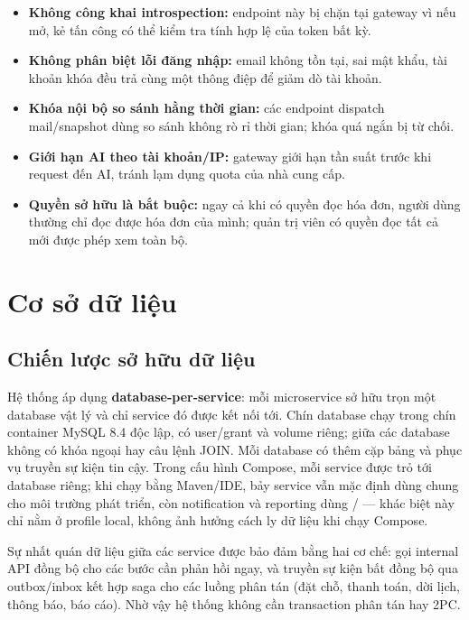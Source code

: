 \begin{itemize}
  \item \textbf{Không công khai introspection:} endpoint này bị chặn tại gateway vì nếu mở, kẻ tấn công có thể kiểm tra tính hợp lệ của token bất kỳ.
  \item \textbf{Không phân biệt lỗi đăng nhập:} email không tồn tại, sai mật khẩu, tài khoản khóa đều trả cùng một thông điệp để giảm dò tài khoản.
  \item \textbf{Khóa nội bộ so sánh hằng thời gian:} các endpoint dispatch mail/snapshot dùng so sánh không rò rỉ thời gian; khóa quá ngắn bị từ chối.
  \item \textbf{Giới hạn AI theo tài khoản/IP:} gateway giới hạn tần suất trước khi request đến AI, tránh lạm dụng quota của nhà cung cấp.
  \item \textbf{Quyền sở hữu là bắt buộc:} ngay cả khi có quyền đọc hóa đơn, người dùng thường chỉ đọc được hóa đơn của mình; quản trị viên có quyền đọc tất cả mới được phép xem toàn bộ.
\end{itemize}

\section{Cơ sở dữ liệu}
\label{sec:co-so-du-lieu}

\subsection{Chiến lược sở hữu dữ liệu}

Hệ thống áp dụng \textbf{database-per-service}: mỗi microservice sở hữu trọn một database vật lý và chỉ service đó được kết nối tới. Chín database chạy trong chín container MySQL 8.4 độc lập, có user/grant và volume riêng; giữa các database không có khóa ngoại hay câu lệnh JOIN. Mỗi database có thêm cặp bảng  và  phục vụ truyền sự kiện tin cậy. Trong cấu hình Compose, mỗi service được trỏ tới database riêng; khi chạy bằng Maven/IDE, bảy service vẫn mặc định dùng chung  cho môi trường phát triển, còn notification và reporting dùng / — khác biệt này chỉ nằm ở profile local, không ảnh hưởng cách ly dữ liệu khi chạy Compose.

Sự nhất quán dữ liệu giữa các service được bảo đảm bằng hai cơ chế: gọi internal API đồng bộ cho các bước cần phản hồi ngay, và truyền sự kiện bất đồng bộ qua outbox/inbox kết hợp saga cho các luồng phân tán (đặt chỗ, thanh toán, dời lịch, thông báo, báo cáo). Nhờ vậy hệ thống không cần transaction phân tán hay 2PC.

